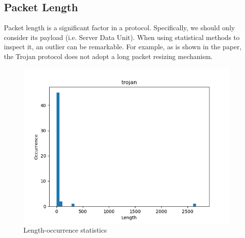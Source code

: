 \subsection{Packet Length}
\begin{frame}

    Packet length is a significant factor in a protocol. Specifically, we should only consider its payload (i.e. Server Data Unit).
    When using statistical methods to inspect it, an outlier can be remarkable. For example, as is shown in the paper, the Trojan protocol does not adopt a long packet resizing mechanism.
\begin{figure}[H]
    \centering
        \includegraphics[scale=0.45]{pics/occurrence_of_length_trojan.png}
    \caption{Length-occurrence statistics}
\end{figure}
\end{frame}

